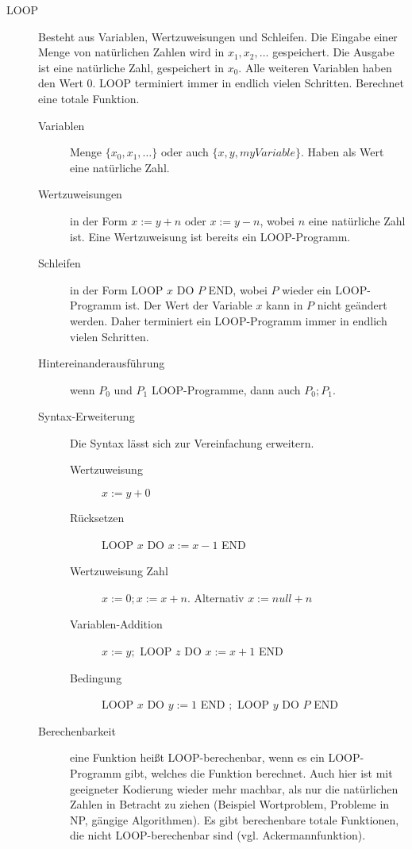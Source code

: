     \begin{description}
        \item[LOOP] Besteht aus Variablen, Wertzuweisungen und Schleifen. Die Eingabe einer Menge von natürlichen Zahlen wird in $x_1, x_2, …$ gespeichert. Die Ausgabe ist eine natürliche Zahl, gespeichert in $x_0$. Alle weiteren Variablen haben den Wert $0$. LOOP terminiert immer in endlich vielen Schritten. Berechnet eine totale Funktion.
            \begin{description}
                \item[Variablen] Menge $\{x_0,x_1,…\}$ oder auch $\{x, y, \mathit{myVariable}\}$. Haben als Wert eine natürliche Zahl.
                \item[Wertzuweisungen] in der Form $x := y + n$ oder $x := y - n$, wobei $n$ eine natürliche Zahl ist. Eine Wertzuweisung ist bereits ein LOOP-Programm.
                \item[Schleifen] in der Form LOOP $x$ DO $P$ END, wobei $P$ wieder ein LOOP-Programm ist. Der Wert der Variable $x$ kann in $P$ nicht geändert werden. Daher terminiert ein LOOP-Programm immer in endlich vielen Schritten.
                \item[Hintereinanderausführung] wenn $P_0$ und $P_1$ LOOP-Programme, dann auch $P_0;P_1$.
                \item[Syntax-Erweiterung] Die Syntax lässt sich zur Vereinfachung erweitern.
                    \begin{description}
                        \item[Wertzuweisung ] $x:=y+0$
                        \item[Rücksetzen ] LOOP $x$ DO $x:=x-1$ END
                        \item[Wertzuweisung Zahl ] $x:=0;x:=x+n$. Alternativ $x:=null+n$
                        \item[Variablen-Addition ] $x:=y;$ LOOP $z$ DO $x:=x+1$ END
                        \item[Bedingung ] LOOP $x$ DO $y:=1$ END $;$ LOOP $y$ DO $P$ END
                    \end{description}
                \item[Berechenbarkeit] eine Funktion heißt LOOP-berechenbar, wenn es ein LOOP-Programm gibt, welches die Funktion berechnet. Auch hier ist mit geeigneter Kodierung wieder mehr machbar, als nur die natürlichen Zahlen in Betracht zu ziehen (Beispiel Wortproblem, Probleme in NP, gängige Algorithmen). Es gibt berechenbare totale Funktionen, die nicht LOOP-berechenbar sind (vgl. Ackermannfunktion).
            \end{description}


\end{description}

